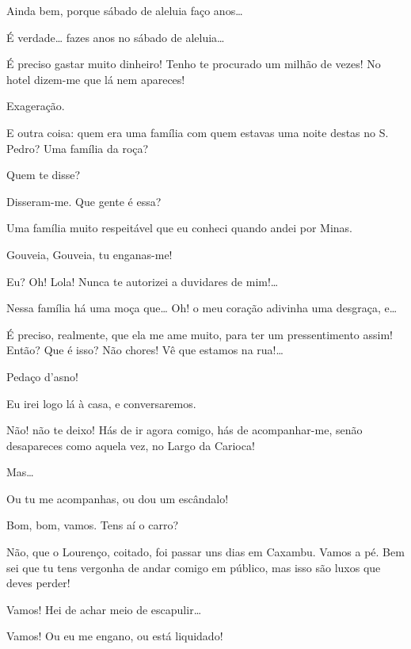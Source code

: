  Ainda bem, porque sábado de aleluia faço anos\ldots{}

 É verdade\ldots{} fazes anos no sábado de aleluia\ldots{}

 É preciso gastar muito dinheiro! Tenho te procurado um milhão de
vezes! No hotel dizem-me que lá nem apareces!

 Exageração.

 E outra coisa: quem era uma família com quem estavas uma noite
destas no S. Pedro? Uma família da roça?

 Quem te disse?

 Disseram-me. Que gente é essa?

 Uma família muito respeitável que eu conheci quando andei por
Minas.

 Gouveia, Gouveia, tu enganas-me!

 Eu? Oh! Lola! Nunca te autorizei a duvidares de mim!\ldots{}

 Nessa família há uma moça que\ldots{} Oh! o meu coração adivinha uma
desgraça, e\ldots{} 

  É preciso, realmente, que ela me ame muito, para ter
um pressentimento assim!  Então? Que é isso? Não chores! Vê que estamos
na rua!\ldots{}

  Pedaço d’asno!

 Eu irei logo lá à casa, e conversaremos.

 Não! não te deixo! Hás de ir agora comigo, hás de acompanhar-me,
senão desapareces como aquela vez, no Largo da Carioca!

 Mas\ldots{}

 Ou tu me acompanhas, ou dou um escândalo!

 Bom, bom, vamos. Tens aí o carro?

 Não, que o Lourenço, coitado, foi passar uns dias em Caxambu. Vamos
a pé. Bem sei que tu tens vergonha de andar comigo em público, mas isso são
luxos que deves perder!

 Vamos!  Hei de achar meio de escapulir\ldots{}

 Vamos!  Ou eu me engano, ou está liquidado! 

